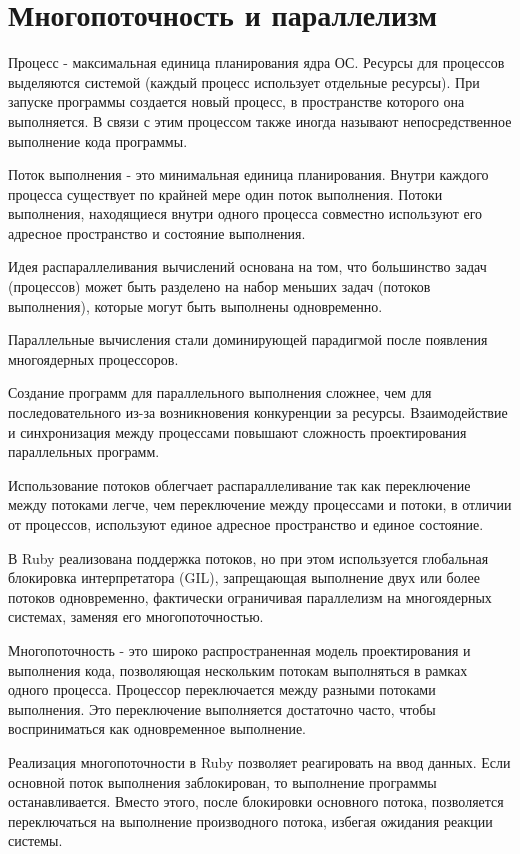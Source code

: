 \chapter{Многопоточность и параллелизм}

Процесс - максимальная единица планирования ядра ОС. Ресурсы для процессов выделяются системой (каждый процесс использует отдельные ресурсы). При запуске программы создается новый процесс, в пространстве которого она выполняется. В связи с этим процессом также иногда называют непосредственное выполнение кода программы.

Поток выполнения - это минимальная единица планирования. Внутри каждого процесса существует по крайней мере один поток выполнения. Потоки выполнения, находящиеся внутри одного процесса совместно используют его адресное пространство и состояние выполнения.

Идея распараллеливания вычислений основана на том, что большинство задач (процессов) может быть разделено на набор меньших задач (потоков выполнения), которые могут быть выполнены одновременно.

Параллельные вычисления стали доминирующей парадигмой после появления многоядерных процессоров.

Создание программ для параллельного выполнения сложнее, чем для последовательного из-за возникновения конкуренции за ресурсы. Взаимодействие и синхронизация между процессами повышают сложность проектирования параллельных программ.

Использование потоков облегчает распараллеливание так как переключение между потоками легче, чем переключение между процессами и потоки, в отличии от процессов, используют единое адресное пространство и единое состояние.

В Ruby реализована поддержка потоков, но при этом используется глобальная блокировка интерпретатора (GIL), запрещающая выполнение двух или более потоков одновременно, фактически ограничивая параллелизм на многоядерных системах, заменяя его многопоточностью.

Многопоточность - это широко распространенная модель проектирования и выполнения кода, позволяющая нескольким потокам выполняться в рамках одного процесса. Процессор переключается между разными потоками выполнения. Это переключение выполняется достаточно часто, чтобы восприниматься как одновременное выполнение.

Реализация многопоточности в Ruby позволяет реагировать на ввод данных. Если основной поток выполнения заблокирован, то выполнение программы останавливается. Вместо этого, после блокировки основного потока, позволяется переключаться на выполнение производного потока, избегая ожидания реакции системы.

